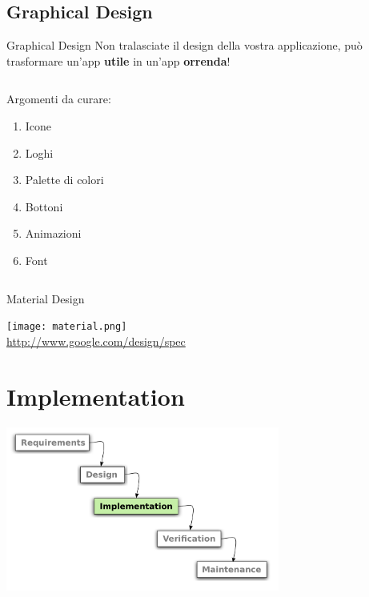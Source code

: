 \documentclass[xcolor=svgnames,11pt]{beamer}
\begin{document}
\subsection{Graphical Design}
\begin{frame}[fragile]{Graphical Design}
Non tralasciate il design della vostra applicazione, pu\`o trasformare un'app \textbf{utile} in un'app \textbf{orrenda}!

\pause
\medskip
\begin{columns}
    \begin{column}{0.3\textwidth}
Argomenti da curare:
\pause
\begin{enumerate}
\item Icone
\pause
\item Loghi
\pause
\item Palette di colori
\pause
\item Bottoni
\pause
\item Animazioni
\pause
\item Font
\end{enumerate}
\end{column}

\begin{column}{0.7\textwidth}
\begin{center}
\end{center}
\end{column}
\end{columns}
\end{frame}

\begin{frame}{Material Design}
\begin{center}
\texttt{[image: material.png]}
\bigskip
 \\
\url{http://www.google.com/design/spec}
\end{center}
\end{frame}


\section{Implementation}

\begin{frame}
\begin{center}
\includegraphics[width=9cm]{waterfall_3.pdf}
\end{center}
\end{frame}
\end{document}
